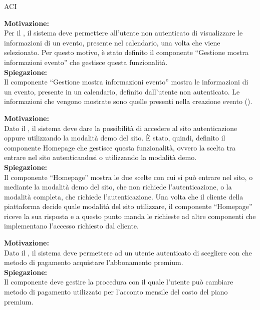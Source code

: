 \begin{listaPersonale}{ACI}

    \textbf{Motivazione:}\\
    Per il , il sistema deve permettere all'utente non autenticato di visualizzare le informazioni di un evento, presente nel calendario, una volta che viene selezionato. Per questo motivo, è stato definito il componente “Gestione mostra informazioni evento” che gestisce questa funzionalità.\\
    \textbf{Spiegazione:}\\
    Il componente “Gestione mostra informazioni evento” mostra le informazioni di un evento, presente in un calendario, definito dall'utente non autenticato. Le informazioni che vengono mostrate sono quelle presenti nella creazione evento ().



    \textbf{Motivazione:}\\
    Dato il , il sistema deve dare la possibilità di accedere al sito autenticazione oppure utilizzando la modalità demo del sito. È stato, quindi, definito il componente Homepage che gestisce questa funzionalità, ovvero la scelta tra entrare nel sito autenticandosi o utilizzando la modalità demo.\\
    \textbf{Spiegazione:}\\
    Il componente “Homepage” mostra le due scelte con cui si può entrare nel sito, o mediante la modalità demo del sito, che non richiede l'autenticazione, o la modalità completa, che richiede l'autenticazione. Una volta che il cliente della piattaforma decide quale modalità del sito utilizzare, il componente “Homepage” riceve la sua risposta e a questo punto manda le richieste ad altre componenti che implementano l'accesso richiesto dal cliente.


    \textbf{Motivazione:}\\
    Dato il , il sistema deve permettere ad un utente autenticato di scegliere con che metodo di pagamento acquistare l'abbonamento premium.\\
    \textbf{Spiegazione:}\\
    Il componente deve gestire la procedura con il quale l'utente può cambiare metodo di pagamento utilizzato per l'acconto mensile del costo del piano premium.



\end{listaPersonale}
